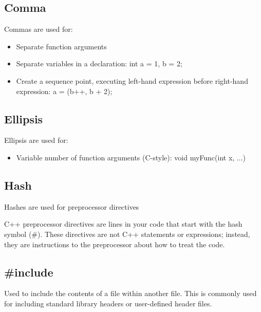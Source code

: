 \documentclass{report}
\begin{document}
    \bigbreak \noindent \bigbreak \noindent
    \begin{minipage}[t]{0.47\textwidth}
    \subsection{Comma}
    \bigbreak \noindent 
    Commas are used for:
    \begin{itemize}
        \item Separate function arguments
        \item Separate variables in a declaration: int a = 1, b = 2;
        \item Create a sequence point, executing left-hand expression before right-hand expression: a = (b++, b + 2);
    \end{itemize}
    \end{minipage}
    \begin{minipage}[t]{0.47\textwidth}
    \subsection{Ellipsis}
    \bigbreak \noindent 
    Ellipsis are used for:
    \begin{itemize}
        \item Variable number of function arguments (C-style): void myFunc(int x, ...)
    \end{itemize}
    \end{minipage}
    \bigbreak \noindent 
    \begin{minipage}[t]{0.47\textwidth}
        \subsection{Hash}
        \bigbreak \noindent 
        Hashes are used for preprocessor  directives
    \end{minipage}



    \pagebreak
    \bigbreak \noindent 
    C++ preprocessor directives are lines in your code that start with the hash symbol (\#). These directives are not C++ statements or expressions; instead, they are instructions to the preprocessor about how to treat the code. 
    \bigbreak \noindent 
    \subsection{\#include}
    \bigbreak \noindent 
    Used to include the contents of a file within another file. This is commonly used for including standard library headers or user-defined header files.
    \bigbreak \noindent 
    
\end{document}
